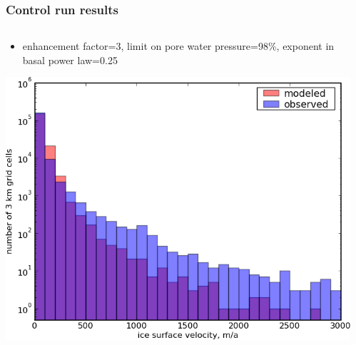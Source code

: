 \documentclass{beamer}
\begin{document}
\begin{frame}
  \frametitle{Control run results}

\begin{columns}
\begin{column}{0.6\textwidth}
\scriptsize
\begin{itemize}
\item enhancement factor=3, limit on pore water pressure=98\%, exponent in basal power law=0.25
\end{itemize}
\begin{center}
  \includegraphics[width=1.0\textwidth]{g3km_3_25_98_hist}
\end{center}
\end{column}
\begin{column}{0.4\textwidth}
\begin{center}

\end{center}
\end{column}
\end{columns}
\end{frame}
\end{document}
